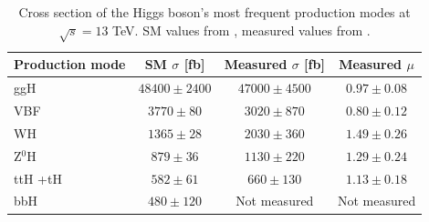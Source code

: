 \begin{table}[ht]
    \centering
    \begin{tabular}{|l|c|c|c|}
        \hline
        \cellcolor{lightgray}Production mode & \cellcolor{lightgray} SM $\sigma$ [fb] & \cellcolor{lightgray} Measured $\sigma$ [fb] & \cellcolor{lightgray} Measured $\mu$ \\ \hline
        ggH                         & $48400 \pm 2400$          & $47000 \pm 4500$          & $0.97 \pm 0.08$           \\
        VBF                         & $3770 \pm 80$             & $3020 \pm 870$            & $0.80 \pm 0.12$    \\
        WH                          & $1365  \pm 28$            & $2030  \pm 360$           & $1.49 \pm 0.26$     \\
        Z$^0$H                      & $879  \pm 36$             & $1130  \pm 220$           & $1.29 \pm 0.24$    \\
        ttH +tH                     & $582  \pm 61$             & $660  \pm 130$             & $1.13 \pm 0.18$    \\
        bbH                         & $480  \pm 120$            & Not measured       & Not measured \\ \hline
    \end{tabular}
    \caption{Cross section of the Higgs boson's most frequent production modes at $\sqrt{s} = 13$ TeV. SM values from \cite{LHCHiggsCrossSectionWorkingGroup:2016ypw}, measured values from \cite{CMS:2022dwd}.}
    \label{tab:Higgs_production}
\end{table}

